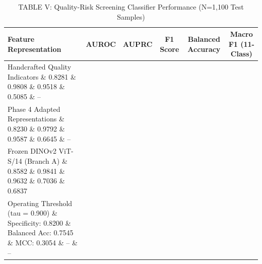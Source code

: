 \begin{table}[t]
\centering
\caption{TABLE V: Quality-Risk Screening Classifier Performance (N=1,100 Test Samples)}
\label{tab:table5_quality_risk_performance}
\begin{tabular}{lccccc}
\hline
\textbf{Feature Representation} & \textbf{AUROC} & \textbf{AUPRC} & \textbf{F1 Score} & \textbf{Balanced Accuracy} & \textbf{Macro F1 (11-Class)} \\
\hline
Handcrafted Quality Indicators \& 0.8281 \& 0.9808 \& 0.9518 \& 0.5085 \& -- \\
Phase 4 Adapted Representations \& 0.8230 \& 0.9792 \& 0.9587 \& 0.6645 \& -- \\
Frozen DINOv2 ViT-S/14 (Branch A) \& 0.8582 \& 0.9841 \& 0.9632 \& 0.7036 \& 0.6837 \\
Operating Threshold (tau = 0.900) \& Specificity: 0.8200 \& Balanced Acc: 0.7545 \& MCC: 0.3054 \& -- \& -- \\
\hline
\end{tabular}
\end{table}
